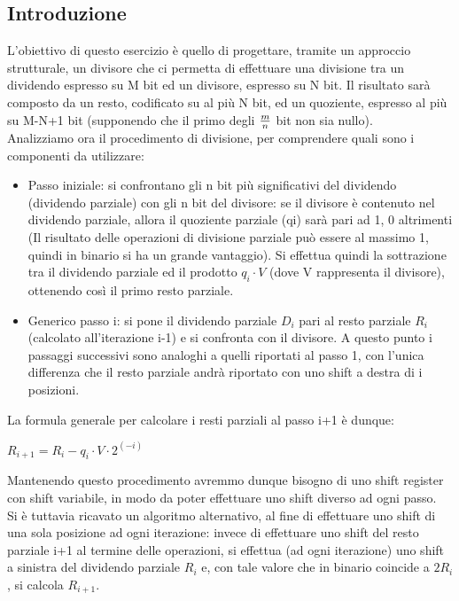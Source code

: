 \documentclass[12pt]{article}
\begin{document}
\subsection{Introduzione}
L’obiettivo di questo esercizio è quello di progettare, tramite un approccio strutturale, un divisore che ci permetta di effettuare una divisione tra un dividendo espresso su M bit ed un divisore, espresso su N bit. Il risultato sarà composto da un resto, codificato su al più N bit, ed un quoziente, espresso al più su M-N+1 bit (supponendo che il primo degli $m \over{n}$ bit non sia nullo).
\\Analizziamo ora il procedimento di divisione, per comprendere quali sono i componenti da utilizzare:
\begin{itemize}
    \item Passo iniziale: si confrontano gli n bit più significativi del dividendo (dividendo parziale) con gli n bit del divisore: se il divisore è contenuto nel dividendo parziale, allora il quoziente parziale (qi) sarà pari ad 1, 0 altrimenti (Il risultato delle operazioni di divisione parziale può essere al massimo 1, quindi in binario si ha un grande vantaggio).
          Si effettua quindi la sottrazione tra il dividendo parziale ed il prodotto $q_i \cdot V$ (dove V rappresenta il divisore), ottenendo così il primo resto parziale.
    \item Generico passo i: si pone il dividendo parziale $D_i$ pari al resto parziale $R_i$ (calcolato all’iterazione i-1) e si confronta con il divisore. A questo punto i passaggi successivi sono analoghi a quelli riportati al passo 1, con l’unica differenza che il resto parziale andrà riportato con uno shift a destra di i posizioni.
\end{itemize}
La formula generale per calcolare i resti parziali al passo i+1 è dunque:
\begin{center}
    \vspace{5mm}$R_{i+1} = R_i -q_i \cdot V \cdot 2^{(-i)}$ \vspace{5mm}
\end{center}
Mantenendo questo procedimento avremmo dunque bisogno di uno shift register con shift variabile, in modo da poter effettuare uno shift diverso ad ogni passo.
\\Si è tuttavia ricavato un algoritmo alternativo, al fine di effettuare uno shift di una sola posizione ad ogni iterazione: invece di effettuare uno shift del resto parziale i+1 al termine delle operazioni, si effettua (ad ogni iterazione) uno shift a sinistra del dividendo parziale $R_i$ e, con tale valore che in binario coincide a $2R_i$, si calcola $R_{i+1}$.
\end{document}
